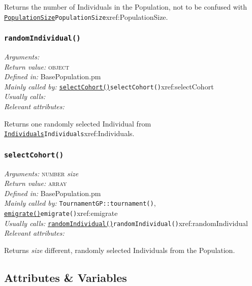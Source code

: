 \documentclass[a4paper]{article}
\begin{document}
Returns the number of Individuals in the Population,
not to be confused with \hyperref[no]{\texttt{PopulationSize}}{\texttt{PopulationSize}}{xref:PopulationSize}.

\subsubsection{\texttt{randomIndividual()}}\label{xref:randomIndividual}
\begin{flushleft}
\textit{Arguments:} \\
\textit{Return value:} \textsc{object}\\
\textit{Defined in:} BasePopulation.pm\\
\textit{Mainly called by:} \hyperref[no]{\texttt{selectCohort()}}{\texttt{selectCohort()}}{xref:selectCohort}\\
\textit{Usually calls:} \\
\textit{Relevant attributes:}
\end{flushleft}

Returns one randomly selected Individual from \hyperref[no]{\texttt{Individuals}}{\texttt{Individuals}}{xref:Individuals}.

\subsubsection{\texttt{selectCohort()}}\label{xref:selectCohort}
\begin{flushleft}
\textit{Arguments:} \textsc{number} \textit{size}\\
\textit{Return value:} \textsc{array}\\
\textit{Defined in:} BasePopulation.pm\\
\textit{Mainly called by:} \texttt{TournamentGP::tournament()}, \hyperref[no]{\texttt{emigrate()}}{\texttt{emigrate()}}{xref:emigrate}\\
\textit{Usually calls:} \hyperref[no]{\texttt{randomIndividual()}}{\texttt{randomIndividual()}}{xref:randomIndividual}\\
\textit{Relevant attributes:}
\end{flushleft}

Returns \textit{size} different, randomly selected Individuals from
the Population.


\subsection{Attributes \& Variables}
\end{document}
